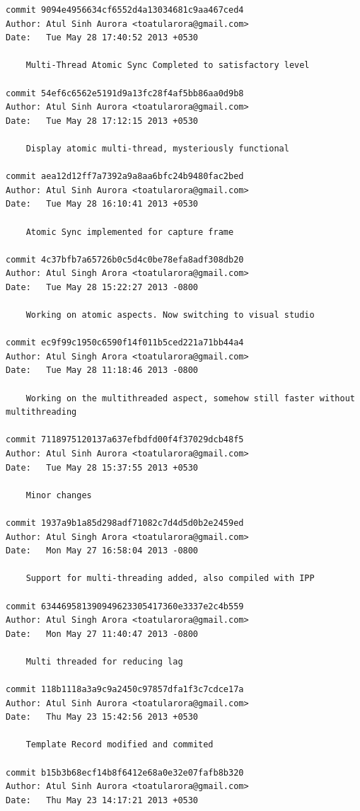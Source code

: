 \begin{lstlisting}
commit 9094e4956634cf6552d4a13034681c9aa467ced4
Author: Atul Sinh Aurora <toatularora@gmail.com>
Date:   Tue May 28 17:40:52 2013 +0530

    Multi-Thread Atomic Sync Completed to satisfactory level

commit 54ef6c6562e5191d9a13fc28f4af5bb86aa0d9b8
Author: Atul Sinh Aurora <toatularora@gmail.com>
Date:   Tue May 28 17:12:15 2013 +0530

    Display atomic multi-thread, mysteriously functional

commit aea12d12ff7a7392a9a8aa6bfc24b9480fac2bed
Author: Atul Sinh Aurora <toatularora@gmail.com>
Date:   Tue May 28 16:10:41 2013 +0530

    Atomic Sync implemented for capture frame

commit 4c37bfb7a65726b0c5d4c0be78efa8adf308db20
Author: Atul Singh Arora <toatularora@gmail.com>
Date:   Tue May 28 15:22:27 2013 -0800

    Working on atomic aspects. Now switching to visual studio

commit ec9f99c1950c6590f14f011b5ced221a71bb44a4
Author: Atul Singh Arora <toatularora@gmail.com>
Date:   Tue May 28 11:18:46 2013 -0800

    Working on the multithreaded aspect, somehow still faster without multithreading

commit 7118975120137a637efbdfd00f4f37029dcb48f5
Author: Atul Sinh Aurora <toatularora@gmail.com>
Date:   Tue May 28 15:37:55 2013 +0530

    Minor changes

commit 1937a9b1a85d298adf71082c7d4d5d0b2e2459ed
Author: Atul Singh Arora <toatularora@gmail.com>
Date:   Mon May 27 16:58:04 2013 -0800

    Support for multi-threading added, also compiled with IPP

commit 634469581390949623305417360e3337e2c4b559
Author: Atul Singh Arora <toatularora@gmail.com>
Date:   Mon May 27 11:40:47 2013 -0800

    Multi threaded for reducing lag

commit 118b1118a3a9c9a2450c97857dfa1f3c7cdce17a
Author: Atul Sinh Aurora <toatularora@gmail.com>
Date:   Thu May 23 15:42:56 2013 +0530

    Template Record modified and commited

commit b15b3b68ecf14b8f6412e68a0e32e07fafb8b320
Author: Atul Sinh Aurora <toatularora@gmail.com>
Date:   Thu May 23 14:17:21 2013 +0530


\end{lstlisting}
